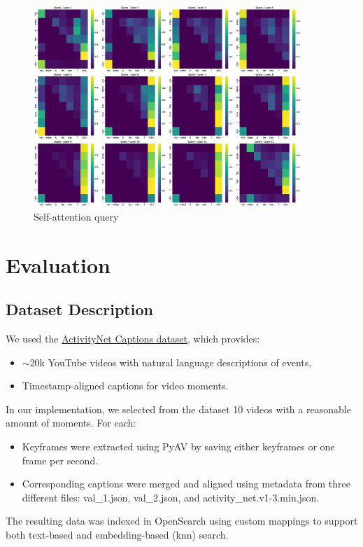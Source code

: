 \documentclass[runningheads]{llncs}
\begin{document}
\begin{figure}[!htb]
  \centering
  \includegraphics[width=0.9\textwidth, clip=true]{../figures/attention_layers_query.eps}
  \caption{Self-attention query}\label{self_att_query}\label{img:self_attention_query}
\end{figure}

\clearpage

\vspace{2\baselineskip plus 0.5\baselineskip minus 0.5\baselineskip} %

\section{Evaluation}

\subsection{Dataset Description}
We used the \href{https://huggingface.co/datasets/HuggingFaceM4/ActivitiyNet_Captions}{ActivityNet Captions dataset}, which provides:

\begin{itemize}
    \item \ensuremath{\sim}20k YouTube videos with natural language descriptions of events,
    \item Timestamp-aligned captions for video moments.
\end{itemize}

In our implementation, we selected from the dataset 10 videos with a reasonable amount of moments. For each:

\begin{itemize}
    \item Keyframes were extracted using PyAV by saving either keyframes or one frame per second.
    \item Corresponding captions were merged and aligned using metadata from three different files: val\_1.json, val\_2.json, and activity\_net.v1-3.min.json.
\end{itemize}

The resulting data was indexed in OpenSearch using custom mappings to support both text-based and embedding-based (knn) search.
\end{document}
